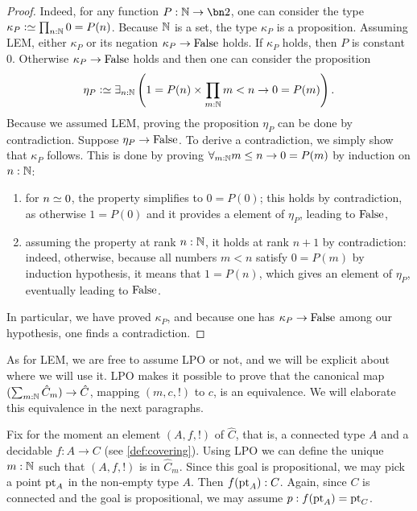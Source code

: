 \begin{proof}
  Indeed, for any function $P:\NN \to \bn 2$, one can consider
  the type $\kappa_P\defequi\prod_{n:\NN}0=P(n)$. Because $\mathbb{N}$ is a set, the type
  $\kappa_P$ is a proposition. Assuming LEM, either $\kappa_P$ or its negation
  $\kappa_P \to \mathrm{False}$ holds. If $\kappa_P$ holds, then $P$ is constant $0$.
  Otherwise $\kappa_P \to \mathrm{False}$ holds and then one can consider the proposition
  \begin{displaymath}
    \eta_P \defequi \exists_{n:\NN}\left( 1=P(n) \times \prod_{m:\NN}m<n \to 0 = P(m) \right).
  \end{displaymath}
  Because we assumed LEM, proving the proposition $\eta_P$ can be
  done by contradiction. Suppose $\eta_P \to \mathrm{False}$. To derive a
  contradiction, we simply show that $\kappa_P$ follows. This is done by proving
  $\forall_{m:\mathbb{N}} m\leq n \to 0 = P(m)$ by induction on $n:\mathbb{N}$:
  \begin{enumerate}
    \item for $n\jdeq 0$, the property simplifies to $0 = P(0)$; this holds by
      contradiction, as otherwise $1 = P(0)$ and it provides a element of
      $\eta_P$, leading to $\mathrm{False}$,
    \item assuming the property at rank $n:\mathbb{N}$, it holds at rank $n+1$ by
      contradiction: indeed, otherwise, because all numbers $m<n$ satisfy $0 =
      P(m)$ by induction hypothesis, it means that $1=P(n)$, which gives an
      element of $\eta_P$, eventually leading to $\mathrm{False}$.
  \end{enumerate}
  In particular, we have proved $\kappa_P$, and because one has $\kappa_P \to
  \mathrm{False}$ among our hypothesis, one finds a contradiction.
\end{proof}

As for LEM, we are free to assume LPO or not, and we will be explicit about
where we will use it. LPO makes it possible to prove that the canonical map
$(\sum_{m:\mathbb{N}} \hat C_m) \to \hat C$, mapping $(m,c,!)$ to $c$, is an
equivalence.  We will elaborate this equivalence in the next paragraphs.

Fix for the moment an element $(A,f,!)$ of $\hat C$, that is,
a connected type $A$ and a decidable \covering  $f:A\to C$ (see \cref{def:covering}).
Using LPO we can define the unique $m:\mathbb{N}$ such that $(A,f,!)$ is in $\hat C_m$.
Since this goal is propositional, we may pick a point $\mathrm{pt}_A$ in
the non-empty type $A$. Then $f(\mathrm{pt}_A) : C$. Again, since $C$ is connected
and the goal is propositional, we may assume $p: f(\mathrm{pt}_A) = \mathrm{pt}_C$.

